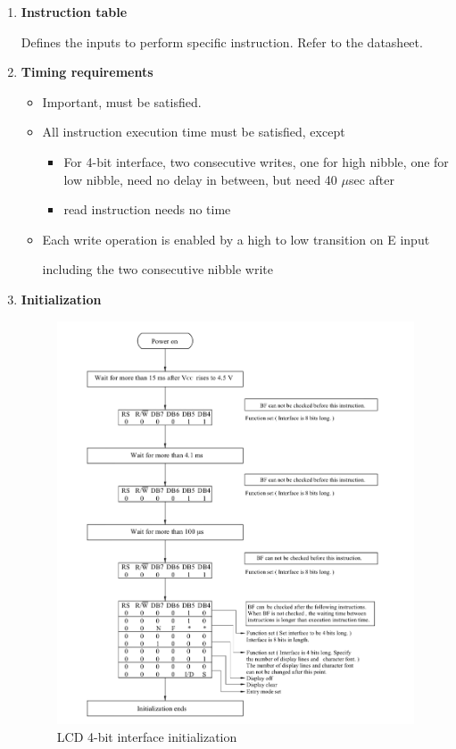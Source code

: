 \documentclass[a4paper]{article}
\begin{document}
\begin{enumerate}[label = \arabic*.]
    \item \textbf{Instruction table}
      \par Defines the inputs to perform specific instruction. Refer to the datasheet.

    \item \textbf{Timing requirements}
      \begin{itemize}[leftmargin = 1cm]
        \item Important, must be satisfied.
        \item All instruction execution time must be satisfied, except
          \begin{itemize}[leftmargin = 1cm]
            \item For 4-bit interface, two consecutive writes, one for high nibble, one for low nibble, need no delay in between, but need 40 \( \mu \)sec after
            \item read instruction needs no time
          \end{itemize}
        \item Each write operation is enabled by a high to low transition on E input
          \par including the two consecutive nibble write
      \end{itemize}

    \item \textbf{Initialization}
      \begin{figure}[H]
        \centering
        \includegraphics[width=0.9\linewidth]{LCD_config_4bit_step.jpeg}
        \caption{LCD 4-bit interface initialization}
        \label{fig:LCD_config_4bit_step.jpeg}
      \end{figure}


\end{enumerate}
\end{document}
